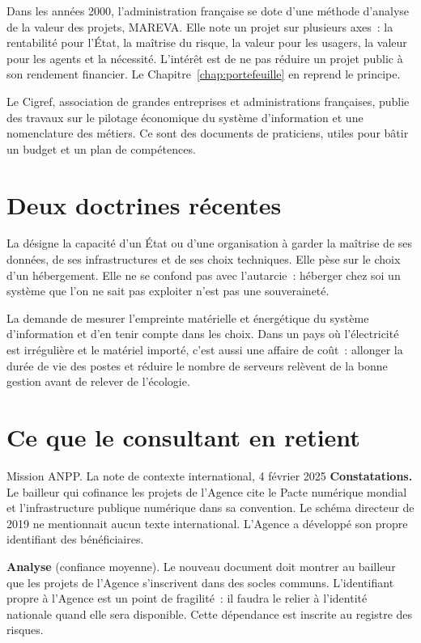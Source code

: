 Dans les années 2000, l'administration française se dote d'une méthode d'analyse de la valeur des projets, MAREVA.
Elle note un projet sur plusieurs axes~: la rentabilité pour l'État, la maîtrise du risque, la valeur pour les
usagers, la valeur pour les agents et la nécessité. L'intérêt est de ne pas réduire un projet public à son
rendement financier. Le Chapitre~\ref{chap:portefeuille} en reprend le principe.

Le Cigref, association de grandes entreprises et administrations françaises, publie des travaux sur le pilotage
économique du système d'information et une nomenclature des métiers. Ce sont des documents de praticiens, utiles
pour bâtir un budget et un plan de compétences.

\section{Deux doctrines récentes}
\label{sec:c05-recent}

La  désigne la capacité d'un État ou d'une organisation à garder la maîtrise de
ses données, de ses infrastructures et de ses choix techniques. Elle pèse sur le choix d'un hébergement. Elle ne
se confond pas avec l'autarcie~: héberger chez soi un système que l'on ne sait pas exploiter n'est pas une
souveraineté.

La  demande de mesurer l'empreinte matérielle et énergétique du système
d'information et d'en tenir compte dans les choix. Dans un pays où l'électricité est irrégulière et le matériel
importé, c'est aussi une affaire de coût~: allonger la durée de vie des postes et réduire le nombre de serveurs
relèvent de la bonne gestion avant de relever de l'écologie.

\section{Ce que le consultant en retient}
\label{sec:c05-usage}

\begin{boxscenario}{Mission ANPP. La note de contexte international, 4 février 2025}
\textbf{Constatations.} Le bailleur qui cofinance les projets de l'Agence cite le Pacte numérique mondial et
l'infrastructure publique numérique dans sa convention. Le schéma directeur de 2019 ne mentionnait aucun texte
international. L'Agence a développé son propre identifiant des bénéficiaires.

\textbf{Analyse} (confiance moyenne). Le nouveau document doit montrer au bailleur que les projets de l'Agence
s'inscrivent dans des socles communs. L'identifiant propre à l'Agence est un point de fragilité~: il faudra le
relier à l'identité nationale quand elle sera disponible. Cette dépendance est inscrite au registre des risques.
\end{boxscenario}

